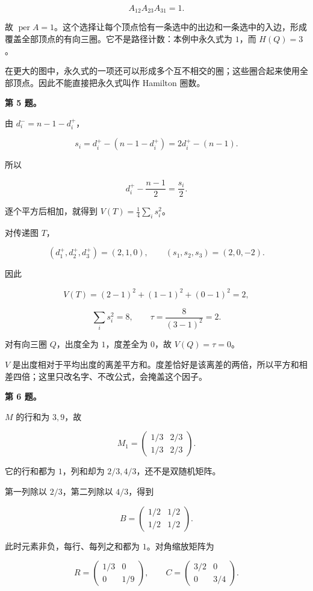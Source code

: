 \documentclass[11pt,a4paper]{article}
\begin{document}
\[A_{12}A_{23}A_{31}=1.\]

故 \(\operatorname{per}A=1\)。这个选择让每个顶点恰有一条选中的出边和一条选中的入边，形成覆盖全部顶点的有向三圈。它不是路径计数：本例中永久式为 \(1\)，而 \(H(Q)=3\)。

在更大的图中，永久式的一项还可以形成多个互不相交的圈；这些圈合起来使用全部顶点。因此不能直接把永久式叫作 Hamilton 圈数。

\textbf{第 5 题。}

由 \(d_i^-=n-1-d_i^+\)，

\[s_i=d_i^+-(n-1-d_i^+)
=2d_i^+-(n-1).\]

所以

\[d_i^+-\frac{n-1}{2}=\frac{s_i}{2}.\]

逐个平方后相加，就得到 \(V(T)=\frac14\sum_i s_i^2\)。

对传递图 \(T\)，

\[(d_1^+,d_2^+,d_3^+)=(2,1,0),\qquad
(s_1,s_2,s_3)=(2,0,-2).\]

因此

\[V(T)=(2-1)^2+(1-1)^2+(0-1)^2=2,\]

\[\sum_i s_i^2=8,\qquad
\tau=\frac8{(3-1)^2}=2.\]

对有向三圈 \(Q\)，出度全为 \(1\)，度差全为 \(0\)，故 \(V(Q)=\tau=0\)。

\(V\) 是出度相对于平均出度的离差平方和。度差恰好是该离差的两倍，所以平方和相差四倍；这里只改名字、不改公式，会掩盖这个因子。

\textbf{第 6 题。}

\(M\) 的行和为 \(3,9\)，故

\[M_1=
\begin{pmatrix}1/3&2/3\\1/3&2/3\end{pmatrix}.\]

它的行和都为 \(1\)，列和却为 \(2/3,4/3\)，还不是双随机矩阵。

第一列除以 \(2/3\)，第二列除以 \(4/3\)，得到

\[B=\begin{pmatrix}1/2&1/2\\1/2&1/2\end{pmatrix}.\]

此时元素非负，每行、每列之和都为 \(1\)。对角缩放矩阵为

\[R=\begin{pmatrix}1/3&0\\0&1/9\end{pmatrix},
\qquad
C=\begin{pmatrix}3/2&0\\0&3/4\end{pmatrix}.\]
\end{document}

